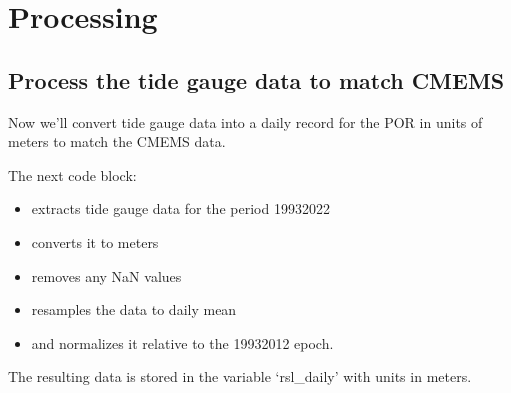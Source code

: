 \documentclass[letterpaper,10pt,english]{jupyterBook}
\begin{document}
\part{Processing}
\label{\detokenize{notebooks/SL_Data_Wrangling:processing}}

\chapter{Process the tide gauge data to match CMEMS}
\label{\detokenize{notebooks/SL_Data_Wrangling:process-the-tide-gauge-data-to-match-cmems}}
\sphinxAtStartPar
Now we’ll convert tide gauge data into a daily record for the POR in units of meters to match the CMEMS data.

\sphinxAtStartPar
The next code block:
\begin{itemize}
\item {} 
\sphinxAtStartPar
extracts tide gauge data for the period 1993\sphinxhyphen{}2022

\item {} 
\sphinxAtStartPar
converts it to meters

\item {} 
\sphinxAtStartPar
removes any NaN values

\item {} 
\sphinxAtStartPar
resamples the data to daily mean

\item {} 
\sphinxAtStartPar
and normalizes it relative to the 1993\sphinxhyphen{}2012 epoch.

\end{itemize}

\sphinxAtStartPar
The resulting data is stored in the variable ‘rsl\_daily’ with units in meters.
\end{document}

